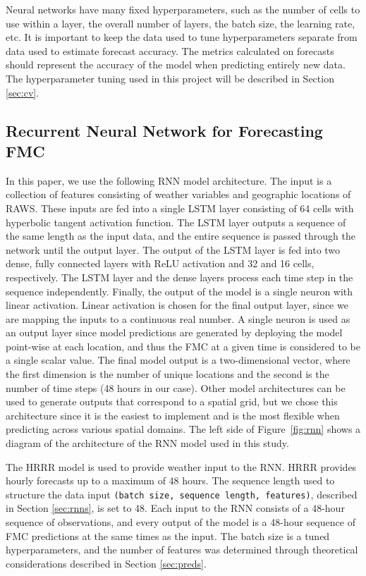 \documentclass[fire,article,submit,pdftex,moreauthors]{Definitions/mdpi}
\begin{document}
Neural networks have many fixed hyperparameters, such as the number of cells to use within a layer, the overall number of layers, the batch size, the learning rate, etc. It is important to keep the data used to tune hyperparameters separate from data used to estimate forecast accuracy. The metrics calculated on forecasts should represent the accuracy of the model when predicting entirely new data. The hyperparameter tuning used in this project will be described in Section \ref{sec:cv}.

\subsection{Recurrent Neural Network for Forecasting FMC}
\label{sec:model}
In this paper, we use the following RNN model architecture. The input is a collection of features consisting of weather variables and geographic locations of RAWS. These inputs are fed into a single LSTM layer consisting of 64 cells with hyperbolic tangent activation function. The LSTM layer outputs a sequence of the same length as the input data, and the entire sequence is passed through the network until the output layer. The output of the LSTM layer is fed into two dense, fully connected layers with ReLU activation and 32 and 16 cells, respectively. The LSTM layer and the dense layers process each time step in the sequence independently. Finally, the output of the model is a single neuron with linear activation. Linear activation is chosen for the final output layer, since we are mapping the inputs to a continuous real number. A single neuron is used as an output layer since model predictions are generated by deploying the model point-wise at each location, and thus the FMC at a given time is considered to be a single scalar value. The final model output is a two-dimensional vector, where the first dimension is the number of unique locations and the second is the number of time steps (48 hours in our case). Other model architectures can be used to generate outputs that correspond to a spatial grid, but we chose this architecture since it is the easiest to implement and is the most flexible when predicting across various spatial domains. The left side of Figure~\ref{fig:rnn} shows a diagram of the architecture of the RNN model used in this study.  

The HRRR model is used to provide weather input to the RNN. HRRR provides hourly forecasts up to a maximum of 48 hours. The sequence length used to structure the data input \texttt{(batch size, sequence length, features)}, described in Section \ref{sec:rnns}, is set to 48. Each input to the RNN consists of a 48-hour sequence of observations, and every output of the model is a 48-hour sequence of FMC predictions at the same times as the input. The batch size is a tuned hyperparameters, and the number of features was determined through theoretical considerations described in Section \ref{sec:preds}. 
\end{document}
